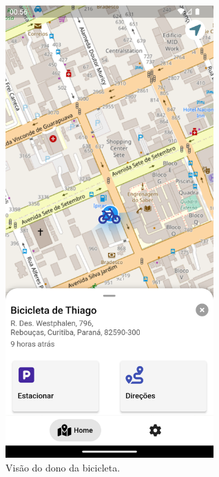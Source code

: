 \begin{figure}[!h]
\centering
\includegraphics[width=8cm]{capitulos/Figuras/app-owner.png}
\caption{Visão do dono da bicicleta.}
\label{fig:app-owner}
\end{figure}

\newpage

